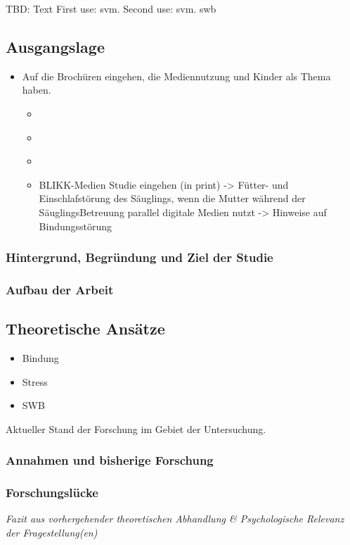 TBD: Text
First use: \gls{svm}. Second use: \gls{svm}. \gls{swb}
\subsection{Ausgangslage}
\begin{itemize}
    \item Auf die Brochüren eingehen, die Mediennutzung und Kinder als Thema haben.
    \begin{itemize}
        \item \cite{Weber2017}
        \item \cite{MariaLuisaNuesch2017}
        \item \cite{Elternbildung2017}
        \item BLIKK-Medien Studie eingehen (in print) -> Fütter- und Einschlafstörung des Säuglings, wenn die Mutter während der SäuglingsBetreuung parallel digitale Medien nutzt -> Hinweise auf Bindungsstörung
    \end{itemize}
\end{itemize}
\subsubsection{Hintergrund, Begründung und Ziel der Studie}
\subsubsection{Aufbau der Arbeit}

\subsection{Theoretische Ansätze}
\begin{itemize}
 \item Bindung
 \item Stress
 \item SWB
\end{itemize}
Aktueller Stand der Forschung im Gebiet der Untersuchung.

\subsubsection{Annahmen und bisherige Forschung}
\subsubsection{Forschungslücke}
\textit{Fazit aus vorhergehender theoretischen Abhandlung \& Psychologische Relevanz der Fragestellung(en)}


